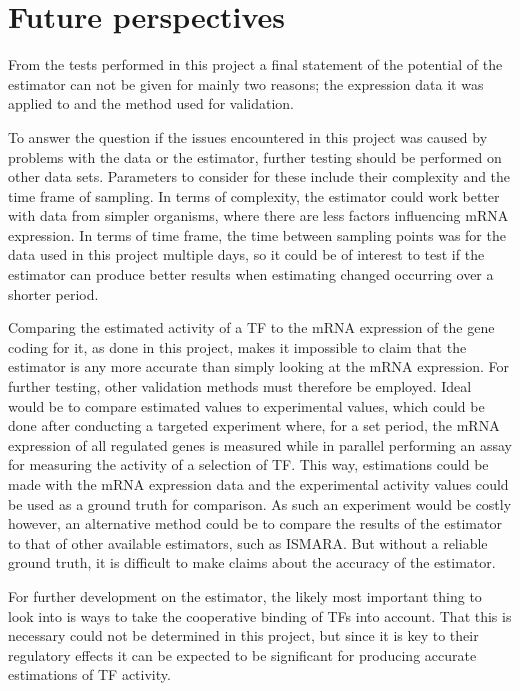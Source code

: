 \chapter{Future perspectives}
\vspace{-0.75cm}
From the tests performed in this project a final statement of the potential of the estimator can not be given for mainly two reasons; the expression data it was applied to and the method used for validation. 

To answer the question if the issues encountered in this project was caused by problems with the data or the estimator, further testing should be performed on other data sets. Parameters to consider for these include their complexity and the time frame of  sampling. In terms of complexity, the estimator could work better with data from simpler organisms, where there are less factors influencing mRNA expression. In terms of time frame, the time between sampling points was for the data used in this project multiple  days, so it could be of interest to test if the estimator can produce better results when estimating changed occurring over a shorter period. 

Comparing the estimated activity of a \ac{TF} to the mRNA expression of the gene coding for it, as done in this project, makes it impossible to claim that the estimator is any more accurate than simply looking at the mRNA expression. For further testing, other validation methods must therefore be employed. Ideal would be to compare estimated values to experimental values, which could be done after conducting a targeted experiment where, for a set period, the mRNA expression of all regulated genes is measured while in parallel performing an assay for measuring the activity of a selection of \ac{TF}. This way, estimations could be made with the mRNA expression data and the experimental activity values could be used as a ground truth for comparison. As such an experiment would be costly however, an alternative method could be to compare the results of the estimator to that of other available estimators, such as ISMARA. But without a reliable ground truth, it is difficult to make claims about the accuracy of the estimator.

 For further development on the estimator, the likely most important thing to look into is ways to take the cooperative binding of \acp{TF} into account. That this is necessary could not be determined in this project, but since it is key to their regulatory effects it can be expected to be significant for producing accurate estimations of \ac{TF} activity. 
 